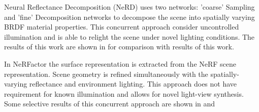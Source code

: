 Neural Reflectance Decomposition (NeRD) \cite{boss2020nerd} uses two networks:
'coarse' Sampling and 'fine' Decomposition networks to decompose the scene into
spatially varying BRDF material properties.
This concurrent approach consider uncontrolled illumination 
and is able to relight the scene under novel lighting conditions.
The results of this work are shown in  for comparison with results of this work.

In NeRFactor \cite{nerfactor} the surface representation is extracted from the NeRF scene representation.
Scene geometry is refined simultaneously with the spatially-varying reflectance and environment lighting.
This approach does not have requirement for known illumination
and allows for novel light-view synthesis.
Some selective results of this concurrent approach are shown in  and 









